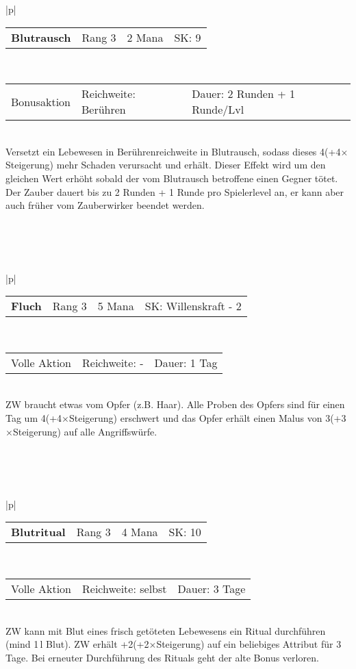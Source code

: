 \documentclass[../../Heldenanleitung2]{subfiles}
\begin{document}
\begin{tabular}{|p{\textwidth}|}
\hline
\begin{tabularx}{\textwidth}{X|X|X|X}
\textbf{Blutrausch} & Rang 3 & 2 Mana & SK: 9
\end{tabularx} \\ \hline
\begin{tabularx}{\textwidth}{X|X|X}
Bonusaktion & Reichweite: Berühren & Dauer: 2 Runden + 1 Runde/Lvl
\end{tabularx} \\ \hline
Versetzt ein Lebewesen in Berührenreichweite in Blutrausch, sodass dieses 4(+4$\times$Steigerung) mehr Schaden verursacht und erhält. Dieser Effekt wird um den gleichen Wert erhöht sobald der vom Blutrausch betroffene einen Gegner tötet. Der Zauber dauert bis zu 2 Runden + 1 Runde pro Spielerlevel an, er kann aber auch früher vom Zauberwirker beendet werden.
\\ \hline
\end{tabular}
\\\\\\
\begin{tabular}{|p{\textwidth}|}
\hline
\begin{tabularx}{\textwidth}{X|X|X|X}
\textbf{Fluch} & Rang 3 & 5 Mana & SK: Willenskraft - 2
\end{tabularx} \\ \hline
\begin{tabularx}{\textwidth}{X|X|X}
Volle Aktion & Reichweite: - & Dauer: 1 Tag
\end{tabularx} \\ \hline
ZW braucht etwas vom Opfer (z.B. Haar). Alle Proben des Opfers sind für einen Tag um 4(+4$\times$Steigerung) erschwert und das Opfer erhält einen Malus von 3(+3$\times$Steigerung) auf alle Angriffswürfe.
\\ \hline
\end{tabular}
\\\\\\
\begin{tabular}{|p{\textwidth}|}
\hline
\begin{tabularx}{\textwidth}{X|X|X|X}
\textbf{Blutritual} & Rang 3 & 4 Mana & SK: 10
\end{tabularx} \\ \hline
\begin{tabularx}{\textwidth}{X|X|X}
Volle Aktion & Reichweite: selbst & Dauer: 3 Tage
\end{tabularx} \\ \hline
ZW kann mit Blut eines frisch getöteten Lebewesens ein Ritual durchführen (mind 1\,l Blut). ZW erhält +2(+2$\times$Steigerung) auf ein beliebiges Attribut für 3 Tage. Bei erneuter Durchführung des Rituals geht der alte Bonus verloren.
\\ \hline
\end{tabular}
\end{document}

